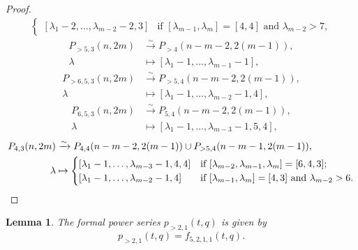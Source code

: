 \documentclass[a4paper, 12pt, reqno]{amsart}
\newtheorem{lemma}[theorem]{Lemma}
\theoremstyle{remark}
\begin{document}
\begin{proof}
\begin{align*}
\begin{cases}
                [\lambda_1 - 2, \dots, \lambda_{m - 2} - 2, 3] &\text{if $[\lambda_{m - 1}, \lambda_m] = [4, 4]$ and $\lambda_{m - 2} > 7$},
              \end{cases}
  \end{align*}
  \begin{align*}
    P_{>5, 3}(n, 2m) &\xrightarrow{\sim} P_{>4}(n - m - 2, 2(m - 1)), \\
    \lambda &\mapsto [\lambda_1 - 1, \dots, \lambda_{m - 1} - 1],
  \end{align*}
  \begin{align*}
    P_{>6, 5, 3}(n, 2m) &\xrightarrow{\sim} P_{>5, 4}(n - m - 2, 2(m - 1)), \\
    \lambda &\mapsto [\lambda_1 - 1, \dots, \lambda_{m - 2} - 1, 4],
  \end{align*}
  \begin{align*}
    P_{6, 5, 3}(n, 2m) &\xrightarrow{\sim} P_{5, 4}(n - m - 2, 2(m - 1)), \\
    \lambda &\mapsto [\lambda_1 - 1, \dots, \lambda_{m - 3} - 1, 5, 4],
  \end{align*}
  \begin{align*}
    P_{4, 3}(n, 2m) &\xrightarrow{\sim} P_{4, 4}(n - m - 2, 2(m - 1)) \cup P_{>5, 4}(n - m - 1, 2(m - 1)), \\
    \lambda &\mapsto
              \begin{cases}
                [\lambda_1 - 1, \dots, \lambda_{m - 3} - 1, 4, 4] &\text{if $[\lambda_{m - 2}, \lambda_{m - 1}, \lambda_m] = [6, 4, 3]$}; \\
                [\lambda_1 - 1, \dots, \lambda_{m - 2} - 1, 4] &\text{if $[\lambda_{m - 1}, \lambda_m] = [4, 3]$ and $\lambda_{m - 2} > 6$}. \qedhere
              \end{cases}
  \end{align*}
\end{proof}

\begin{lemma}
  \label{lmm:30}
  The formal power series $p_{>2, 1}(t, q)$ is given by
  \begin{equation*}
    p_{>2, 1}(t, q) = f_{5, 2, 1, 1}(t, q).
  \end{equation*}
\end{lemma}
\end{document}
